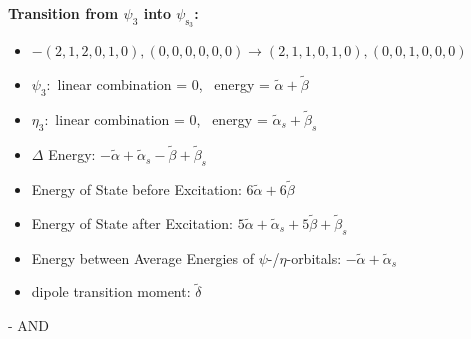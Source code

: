 \documentclass[12pt,a4paper]{article}
\begin{document}
        \noindent\textbf{Transition from $\psi_{3}$ into $\psi_{\text{s}_{3}}$:}
        \begin{itemize}
            \item $- (2, 1, 2, 0, 1, 0), (0, 0, 0, 0, 0, 0) \rightarrow (2, 1, 1, 0, 1, 0), (0, 0, 1, 0, 0, 0)$
        
            \item $\psi_{3}:$ linear combination = $0$, \
            energy = $\tilde{\alpha} + \tilde{\beta}$
            
            \item $\eta_{3}:$ linear combination = $0$, \
            energy = $\tilde{\alpha}_{s} + \tilde{\beta}_{s}$
            
                \item $\Delta$ Energy: $- \tilde{\alpha} + \tilde{\alpha}_{s} - \tilde{\beta} + \tilde{\beta}_{s}$
                \item Energy of State before Excitation: $6 \tilde{\alpha} + 6 \tilde{\beta}$
                \item Energy of State after Excitation: $5 \tilde{\alpha} + \tilde{\alpha}_{s} + 5 \tilde{\beta} + \tilde{\beta}_{s}$
                \item Energy between Average Energies of $\psi$-/$\eta$-orbitals: $- \tilde{\alpha} + \tilde{\alpha}_{s}$
            
            \item dipole transition moment: $\tilde{\delta}$
        
        \end{itemize}
        
 -  AND 
\end{document}
